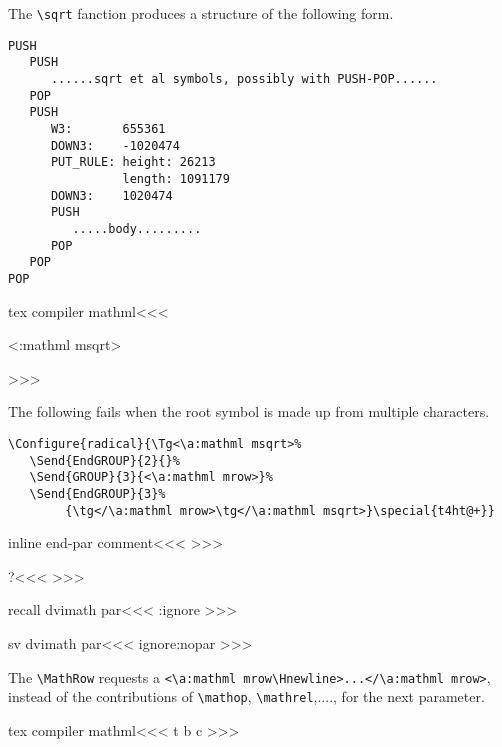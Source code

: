 {{{{{{The \verb+\sqrt+ fanction produces a structure of the following form.

\begin{verbatim}
PUSH
   PUSH
      ......sqrt et al symbols, possibly with PUSH-POP......
   POP
   PUSH
      W3:       655361
      DOWN3:    -1020474
      PUT_RULE: height: 26213
                length: 1091179
      DOWN3:    1020474
      PUSH
         .....body.........
      POP
   POP
POP
\end{verbatim}



\<tex compiler mathml\><<<
  {\Tg<\a:mathml msqrt>%
  }
>>>

The following fails when the root symbol is made up
from multiple characters.

\begin{verbatim}
\Configure{radical}{\Tg<\a:mathml msqrt>%
   \Send{EndGROUP}{2}{}%
   \Send{GROUP}{3}{<\a:mathml mrow>}%
   \Send{EndGROUP}{3}%
        {\tg</\a:mathml mrow>\tg</\a:mathml msqrt>}\special{t4ht@+}}
\end{verbatim}




\<inline end-par comment\><<<
\ifvmode\else {}\fi
>>>


\<?\><<<
\def\MathRow#1{%
   \Configure{\expandafter\:gobble\string#1*}{*}%
      {<\a:mathml mrow\Hnewline 
         \mml:class="\expandafter\:gobble\string#1">}{</\a:mathml mrow>}%
      {\Configure{\expandafter\:gobble\string#1}{}{}{}{}}#1}%
>>>


\<recall dvimath par\><<<
\sv:ignore
>>>

\<sv dvimath par\><<<
\edef\sv:ignore{\if:nopar  
    \noexpand\IgnorePar\else \noexpand\ShowPar\fi}%
>>>


The \verb'\MathRow' requests a \verb'<\a:mathml mrow\Hnewline>...</\a:mathml mrow>', instead of the contributions
of \verb'\mathop', \verb'\mathrel',...., for the next parameter.


\<tex compiler mathml\><<<
\def\:MT{\ifmathml \a:mathml m\fi}
\Configure{halignTB}{\HCode{<\:MT table }\halignTBL}{\HCode{>}}
   {t}{}
   {b}{}
   {c}{}
   {}
\def\t:HA{\HCode{</\:MT table>}}
\def\R:HA{\HCode{<\:MT tr \Hnewline style="vertical-align:baseline">}}
\def\r:HA{\HCode{</\:MT tr>}}
\def\D:HA{|<td save EndP|>\HCode{<\:MT td 
                        \ifnum \HMultispan>1 colspan="\HMultispan"\fi}%
   \halignTD \HCode{\Hnewline>}}
\def\d:HA{\HCode{</\:MT td>}|<td recall EndP|>}
>>>

}}}}}}
